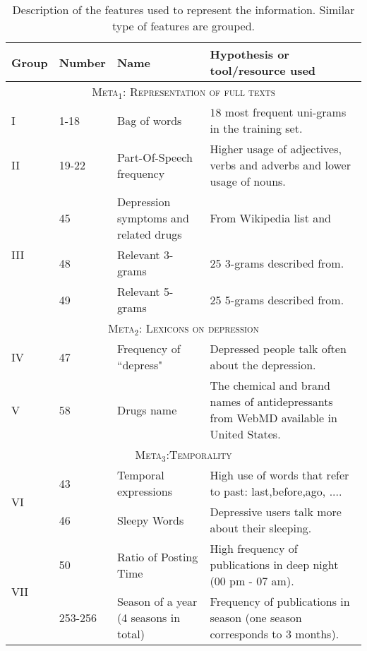\begin{center}
\begin{longtable}{@{} l@{\hspace{.2em}} l@{\hspace{.2em}} p{3.3cm} @{\hspace{.2em}} @{\hspace{.2em}} p{6cm}} 
\caption{Description of the features used to represent the information. Similar type of features are grouped.}\label{CH4:tab:features}\\
\hline
Group & Number & Name & Hypothesis or tool/resource used\\
\hline
\endfirsthead
\endhead
\multicolumn{4}{c}{\scshape{Meta$_{1}$}: Representation of full texts}\\
\hline
 I & 1-18 & Bag of words & $18$ most frequent uni-grams in the training set.\\[3pt]
\hline
II & 19-22 & Part-Of-Speech frequency & Higher usage of adjectives, verbs and adverbs and lower usage of nouns.\\[3pt]
\hline
\multirow{3}{*}{III}
& 45 & Depression symptoms and related drugs & From Wikipedia list and ~\cite{Choudhury2013}\\
& 48 & Relevant 3-grams & 25 3-grams described from.\\
& 49 & Relevant 5-grams & 25 5-grams described from.\\[3pt]
\hline
\multicolumn{4}{c}{\scshape{Meta$_{2}$}: Lexicons on depression}\\
\hline
IV & 47 & Frequency of ``depress" & Depressed people talk often about the depression.\\[3pt]
\hline
V & 58 & {Drugs name} & The chemical and brand names of antidepressants from WebMD available in United States.\\[3pt]
\hline
\multicolumn{4}{c}{\scshape{Meta$_{3}$}:Temporality}\\
\hline
\multirow{2}{*}{VI}
& 43 & Temporal expressions & High use of words that refer to past: last,before,ago, ....\\
& 46 & Sleepy Words & Depressive users talk more about their sleeping.\\[3pt]
\hline
\multirow{2}{*}{VII}
& 50 & Ratio of Posting Time & High frequency of publications in deep night (00 pm - 07 am).\\
& 253-256 & Season of a year (4 seasons in total) & {Frequency of publications in season (one season corresponds to 3 months).}\\[3pt]

\end{longtable}
\end{center}
